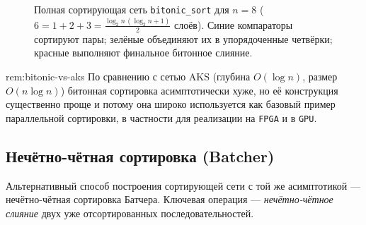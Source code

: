 \begin{figure}[h]
	\caption{Полная сортирующая сеть \texttt{bitonic\_sort} для $n=8$
		($6=1+2+3=\tfrac{\log_2 n\,(\log_2 n+1)}{2}$ слоёв).
		{\color{blue}Синие} компараторы сортируют пары;
		{\color{teal}зелёные} объединяют их в упорядоченные четвёрки;
		{\color{red!80!black}красные} выполняют финальное битонное слияние.}
	\label{fig:bitonic-sort-full}
\end{figure}

\begin{Remark}{}{rem:bitonic-vs-aks}
	По сравнению с сетью AKS (глубина $O(\log n)$, размер $O(n\log n)$) битонная сортировка асимптотически хуже, но её конструкция существенно проще и потому она широко используется как базовый пример параллельной сортировки, в частности для реализации на \texttt{FPGA} и в \texttt{GPU}.
\end{Remark}

\subsection{Нечётно-чётная сортировка (Batcher)}

Альтернативный способ построения сортирующей сети с той же асимптотикой --- нечётно-чётная сортировка Батчера.
Ключевая операция --- \emph{нечётно-чётное слияние} двух уже отсортированных последовательностей.

